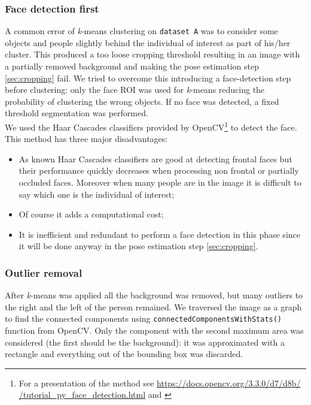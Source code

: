 \documentclass{article}
\begin{document}
\subsubsection{Face detection first}
A common error of \textit{k}-means clustering on \verb|dataset A| was to consider some objects and people slightly behind the individual of interest as part of his/her cluster. This produced a too loose cropping threshold resulting in an image with a partially removed background and making the pose estimation step \ref{sec:cropping} fail. We tried to overcome this introducing a face-detection step before clustering: only the face ROI was used for \textit{k}-means reducing the probability of clustering the wrong objects. If no face was detected, a fixed threshold segmentation was performed. \\
We used the Haar Cascades classifiers provided by OpenCV\footnote{For a presentation of the method see \href{https://docs.opencv.org/3.3.0/d7/d8b/tutorial_py_face_detection.html}{https://docs.opencv.org/3.3.0/d7/d8b/ \\
/tutorial\_py\_face\_detection.html} and \citet{ViolaJones}} to detect the face. \\
This method has three major disadvantages:
\begin{itemize}
	\item As known Haar Cascades classifiers are good at detecting frontal faces but their performance quickly decreases when processing non frontal or partially occluded faces. Moreover when many people are in the image it is difficult to say which one is the individual of interest;
	\item Of course it adds a computational cost;
	\item It is inefficient and redundant to perform a face detection in this phase since it will be done anyway in the pose estimation step \ref{sec:cropping}.
\end{itemize}

\subsubsection{Outlier removal}
After \textit{k}-means was applied all the background was removed, but many outliers to the right and the left of the person remained.
We traversed the image as a graph to find the connected components using \verb|connectedComponentsWithStats()| function from OpenCV. Only the component with the second maximum area was considered (the first should be the background): it was approximated with a rectangle and everything out of the bounding box was discarded.
\end{document}
